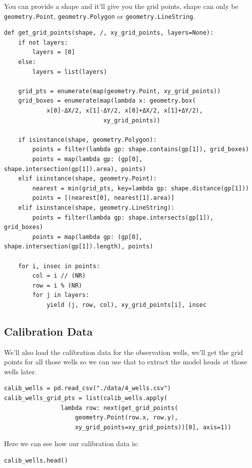 \documentclass[titlepage,12pt]{unisubmission}
\begin{document}
You can provide a shape and it'll give you the grid points, shape can only be \texttt{geometry.Point}, \texttt{geometry.Polygon} or \texttt{geometry.LineString}.

\begin{verbatim}
def get_grid_points(shape, /, xy_grid_points, layers=None):
    if not layers:
        layers = [0]
    else:
        layers = list(layers)

    grid_pts = enumerate(map(geometry.Point, xy_grid_points))
    grid_boxes = enumerate(map(lambda x: geometry.box(
            x[0]-ΔX/2, x[1]-ΔY/2, x[0]+ΔX/2, x[1]+ΔY/2),
                            xy_grid_points))

    if isinstance(shape, geometry.Polygon):
        points = filter(lambda gp: shape.contains(gp[1]), grid_boxes)
        points = map(lambda gp: (gp[0], shape.intersection(gp[1]).area), points)
    elif isinstance(shape, geometry.Point):
        nearest = min(grid_pts, key=lambda gp: shape.distance(gp[1]))
        points = [(nearest[0], nearest[1].area)]
    elif isinstance(shape, geometry.LineString):
        points = filter(lambda gp: shape.intersects(gp[1]), grid_boxes)
        points = map(lambda gp: (gp[0], shape.intersection(gp[1]).length), points)

    for i, insec in points:
        col = i // (NR)
        row = i % (NR)
        for j in layers:
            yield (j, row, col), xy_grid_points[i], insec
\end{verbatim}


\subsection{Calibration Data}
\label{sec:org3baa65d}
We'll also load the calibration data for the observation wells, we'll get the grid points for all those wells so we can use that to extract the model heads at those wells later.

\begin{verbatim}
calib_wells = pd.read_csv("./data/4_wells.csv")
calib_wells_grid_pts = list(calib_wells.apply(
                lambda row: next(get_grid_points(
                    geometry.Point(row.x, row.y),
                    xy_grid_points=xy_grid_points))[0], axis=1))
\end{verbatim}

Here we can see how our calibration data is:

\begin{verbatim}
calib_wells.head()
\end{verbatim}
\end{document}
